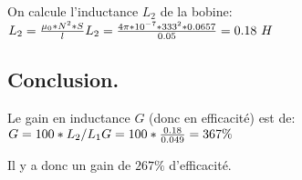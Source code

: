 On calcule l'inductance $L_{2}$ de la bobine: \\
\begin{math}
	L_{2} = \frac{\mu_0*N^2*S}{l} \\
	L_{2} = \frac{4\pi*10^{-7}*333^2*0.0657}{0.05}= 0.18\ H
\end{math}

\subsection{Conclusion.}
Le gain en inductance $G$ (donc en efficacité) est de: \\
\begin{math}
	G = 100*L_{2}/L_{1} \\
	G = 100 * \frac{0.18}{0.049} = 367\%
\end{math}

Il y a donc un gain de $267\%$ d'efficacité.


